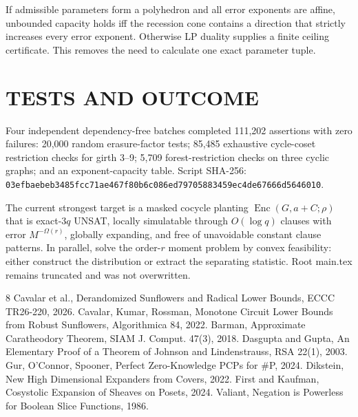 \documentclass[11pt]{article}
\begin{document}
If admissible parameters form a polyhedron and all error exponents are affine, unbounded capacity holds iff the recession cone contains a direction that strictly increases every error exponent. Otherwise LP duality supplies a finite ceiling certificate. This removes the need to calculate one exact parameter tuple.

\section{TESTS AND OUTCOME}
Four independent dependency-free batches completed 111,202 assertions with zero failures: 20,000 random erasure-factor tests; 85,485 exhaustive cycle-coset restriction checks for girth 3--9; 5,709 forest-restriction checks on three cyclic graphs; and an exponent-capacity table. Script SHA-256: \texttt{03efbaebeb3485fcc71ae467f80b6c086ed79705883459ec4de67666d5646010}.

The current strongest target is a masked cocycle planting $\operatorname{Enc}(G,a+C;\rho)$ that is exact-$3q$ UNSAT, locally simulatable through $O(\log q)$ clauses with error $M^{-\Omega(r)}$, globally expanding, and free of unavoidable constant clause patterns. In parallel, solve the order-$r$ moment problem by convex feasibility: either construct the distribution or extract the separating statistic. Root main.tex remains truncated and was not overwritten.

\begin{thebibliography}{8}
 Cavalar et al., Derandomized Sunflowers and Radical Lower Bounds, ECCC TR26-220, 2026.
 Cavalar, Kumar, Rossman, Monotone Circuit Lower Bounds from Robust Sunflowers, Algorithmica 84, 2022.
 Barman, Approximate Caratheodory Theorem, SIAM J. Comput. 47(3), 2018.
 Dasgupta and Gupta, An Elementary Proof of a Theorem of Johnson and Lindenstrauss, RSA 22(1), 2003.
 Gur, O'Connor, Spooner, Perfect Zero-Knowledge PCPs for \#P, 2024.
 Dikstein, New High Dimensional Expanders from Covers, 2022.
 First and Kaufman, Cosystolic Expansion of Sheaves on Posets, 2024.
 Valiant, Negation is Powerless for Boolean Slice Functions, 1986.
\end{thebibliography}
\end{document}
